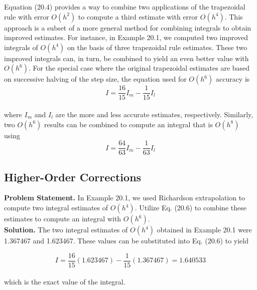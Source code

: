 \documentclass[../main.tex]{subfiles}
\begin{document}
\vspace{0.3in}
Equation (20.4) provides a way to combine two applications of the trapezoidal rule
with error $O(h^2)$ to compute a third estimate with error $O(h^4)$. This approach is a subset of
a more general method for combining integrals to obtain improved estimates. For instance,
in Example 20.1, we computed two improved integrals of $O(h^4)$ on the basis of three trapezoidal rule estimates. These two improved integrals can, in turn, be combined to yield an
even better value with $O(h^6)$. For the special case where the original trapezoidal estimates
are based on successive halving of the step size, the equation used for $O(h^6)$ accuracy is
\begin{equation}
	\tag{20.6}
	I=\dfrac{16}{15}I_m-\dfrac{1}{15}I_l
\end{equation}\\
where $I_m$ and $I_l$ are the more and less accurate estimates, respectively. Similarly, two
$O(h^6)$ results can be combined to compute an integral that is $O(h^8)$ using
\begin{equation}
	\tag{20.7}
	I=\dfrac{64}{63}I_m-\dfrac{1}{63}I_l
\end{equation}


\subsection{Higher-Order Corrections}
\textbf{Problem Statement.}  In Example 20.1, we used Richardson extrapolation to compute two
integral estimates of $O(h^4)$. Utilize Eq. (20.6) to combine these estimates to compute an
integral with $O(h^6)$.\\

\textbf{Solution.} The two integral estimates of $O(h^4)$ obtained in Example 20.1 were 1.367467
and 1.623467. These values can be substituted into Eq. (20.6) to yield

	$$I=\dfrac{16}{15}(1.623467)-\dfrac{1}{15}(1.367467)=1.640533$$\\
which is the exact value of the integral.
\end{document}
